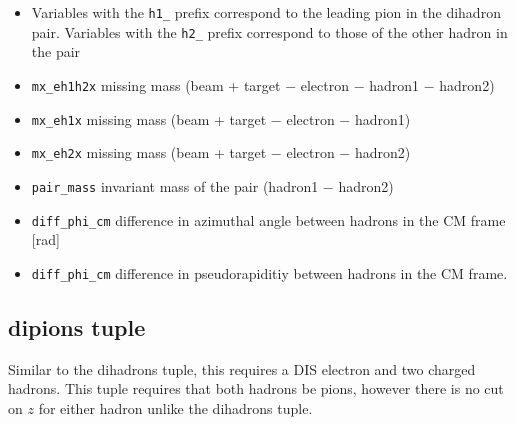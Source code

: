 \documentclass[english]{article}
\newcommand{\code}[1]{\texttt{#1}}
\begin{document}
\begin{itemize}
\item Variables with the \code{h1\_} prefix correspond to the leading pion in the dihadron pair.  Variables with the \code{h2\_} prefix correspond to those of the other hadron in the pair
\item \code{mx\_eh1h2x} missing mass (beam + target $-$ electron $-$ hadron1 $-$ hadron2)
\item \code{mx\_eh1x} missing mass (beam + target $-$ electron $-$ hadron1)
\item \code{mx\_eh2x} missing mass (beam + target $-$ electron $-$ hadron2)
\item \code{pair\_mass} invariant mass of the pair (hadron1 $-$ hadron2)
\item \code{diff\_phi\_cm} difference in azimuthal angle between hadrons in the CM frame [rad]
\item \code{diff\_phi\_cm} difference in pseudorapiditiy between hadrons in the CM frame.
\end{itemize}

\subsection{dipions tuple}
Similar to the dihadrons tuple, this requires a DIS electron and two charged hadrons.  This tuple requires that both hadrons be pions, however there is no cut on $z$ for either hadron unlike the dihadrons tuple. 
\end{document}
